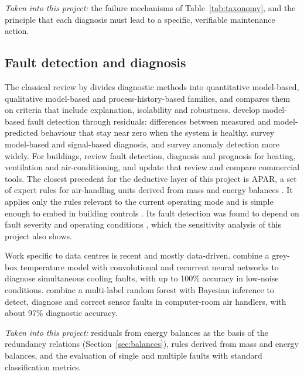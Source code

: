\emph{Taken into this project:} the failure mechanisms of Table~\ref{tab:taxonomy}, and the principle that each diagnosis must lead to a specific, verifiable maintenance action.

\subsection{Fault detection and diagnosis}

The classical review by \textcite{venkat2003,venkat2003b,venkat2003c} divides diagnostic methods into quantitative model-based, qualitative model-based and process-history-based families, and compares them on criteria that include explanation, isolability and robustness. \textcite{isermann2005,isermann2006} develop model-based fault detection through residuals: differences between measured and model-predicted behaviour that stay near zero when the system is healthy. \textcite{gao2015} survey model-based and signal-based diagnosis, and \textcite{chandola2009} survey anomaly detection more widely. For buildings, \textcite{katipamula2005a,katipamula2005b} review fault detection, diagnosis and prognosis for heating, ventilation and air-conditioning, and \textcite{kim2018} update that review and compare commercial tools. The closest precedent for the deductive layer of this project is APAR, a set of expert rules for air-handling units derived from mass and energy balances \parencite{house2001}. It applies only the rules relevant to the current operating mode and is simple enough to embed in building controls \parencite{schein2006}. Its fault detection was found to depend on fault severity and operating conditions \parencite{house2001}, which the sensitivity analysis of this project also shows.

Work specific to data centres is recent and mostly data-driven. \textcite{asgari2021} combine a grey-box temperature model with convolutional and recurrent neural networks to diagnose simultaneous cooling faults, with up to 100\% accuracy in low-noise conditions. \textcite{wang2024} combine a multi-label random forest with Bayesian inference to detect, diagnose and correct sensor faults in computer-room air handlers, with about 97\% diagnostic accuracy.

\emph{Taken into this project:} residuals from energy balances as the basis of the redundancy relations (Section~\ref{sec:balances}), rules derived from mass and energy balances, and the evaluation of single and multiple faults with standard classification metrics.

